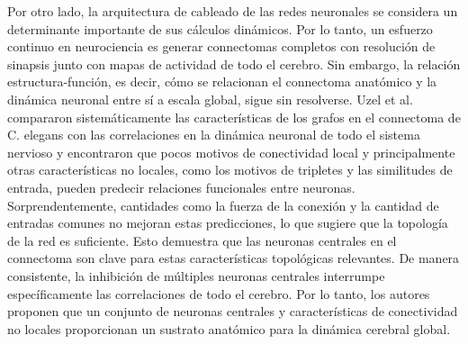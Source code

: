 Por otro lado, la arquitectura de cableado de las redes neuronales se considera un determinante importante de sus cálculos dinámicos. Por lo tanto, un esfuerzo continuo en neurociencia es generar connectomas completos con resolución de sinapsis junto con mapas de actividad de todo el cerebro. Sin embargo, la relación estructura-función, es decir, cómo se relacionan el connectoma anatómico y la dinámica neuronal entre sí a escala global, sigue sin resolverse. Uzel et al. \cite{uzel_set_2022} compararon sistemáticamente las características de los grafos en el connectoma de C. elegans con las correlaciones en la dinámica neuronal de todo el sistema nervioso y encontraron que pocos motivos de conectividad local y principalmente otras características no locales, como los motivos de tripletes y las similitudes de entrada, pueden predecir relaciones funcionales entre neuronas. Sorprendentemente, cantidades como la fuerza de la conexión y la cantidad de entradas comunes no mejoran estas predicciones, lo que sugiere que la topología de la red es suficiente. Esto demuestra que las neuronas centrales en el connectoma son clave para estas características topológicas relevantes. De manera consistente, la inhibición de múltiples neuronas centrales interrumpe específicamente las correlaciones de todo el cerebro. Por lo tanto, los autores proponen que un conjunto de neuronas centrales y características de conectividad no locales proporcionan un sustrato anatómico para la dinámica cerebral global.


